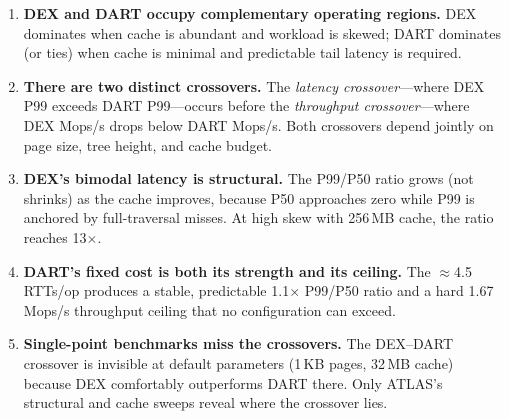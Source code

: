 \documentclass[sigconf, nonacm]{acmart}
\begin{document}
\begin{enumerate}
  \item \textbf{DEX and DART occupy complementary operating regions.} DEX dominates when cache is abundant and workload is skewed; DART dominates (or ties) when cache is minimal and predictable tail latency is required.

  \item \textbf{There are two distinct crossovers.} The \emph{latency crossover}---where DEX P99 exceeds DART P99---occurs before the \emph{throughput crossover}---where DEX Mops/s drops below DART Mops/s. Both crossovers depend jointly on page size, tree height, and cache budget.

  \item \textbf{DEX's bimodal latency is structural.} The P99/P50 ratio grows (not shrinks) as the cache improves, because P50 approaches zero while P99 is anchored by full-traversal misses. At high skew with 256\,MB cache, the ratio reaches 13$\times$.

  \item \textbf{DART's fixed cost is both its strength and its ceiling.} The ${\approx}$4.5 RTTs/op produces a stable, predictable 1.1$\times$ P99/P50 ratio and a hard 1.67\,Mops/s throughput ceiling that no configuration can exceed.

  \item \textbf{Single-point benchmarks miss the crossovers.} The DEX--DART crossover is invisible at default parameters (1\,KB pages, 32\,MB cache) because DEX comfortably outperforms DART there. Only ATLAS's structural and cache sweeps reveal where the crossover lies.
\end{enumerate}

\begin{acks}
\end{acks}



\end{document}
